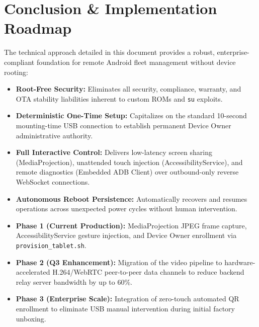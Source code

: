 \documentclass[11pt,a4paper]{article}
\begin{document}
\section{Conclusion \& Implementation Roadmap}

The technical approach detailed in this document provides a robust, enterprise-compliant foundation for remote Android fleet management without device rooting:
\begin{itemize}[leftmargin=*]
    \item \textbf{Root-Free Security:} Eliminates all security, compliance, warranty, and OTA stability liabilities inherent to custom ROMs and \texttt{su} exploits.
    \item \textbf{Deterministic One-Time Setup:} Capitalizes on the standard 10-second mounting-time USB connection to establish permanent Device Owner administrative authority.
    \item \textbf{Full Interactive Control:} Delivers low-latency screen sharing (MediaProjection), unattended touch injection (AccessibilityService), and remote diagnostics (Embedded ADB Client) over outbound-only reverse WebSocket connections.
    \item \textbf{Autonomous Reboot Persistence:} Automatically recovers and resumes operations across unexpected power cycles without human intervention.
\end{itemize}

\vspace{0.3cm}
\begin{tcolorbox}[colback=navyPrimary!5,colframe=navyPrimary,arc=3mm,title=\textbf{Fleet Engineering Roadmap}]
\begin{itemize}[leftmargin=*]
    \item \textbf{Phase 1 (Current Production):} MediaProjection JPEG frame capture, AccessibilityService gesture injection, and Device Owner enrollment via \texttt{provision\_tablet.sh}.
    \item \textbf{Phase 2 (Q3 Enhancement):} Migration of the video pipeline to hardware-accelerated H.264/WebRTC peer-to-peer data channels to reduce backend relay server bandwidth by up to 60\%.
    \item \textbf{Phase 3 (Enterprise Scale):} Integration of zero-touch automated QR enrollment to eliminate USB manual intervention during initial factory unboxing.
\end{itemize}
\end{tcolorbox}
\end{document}
